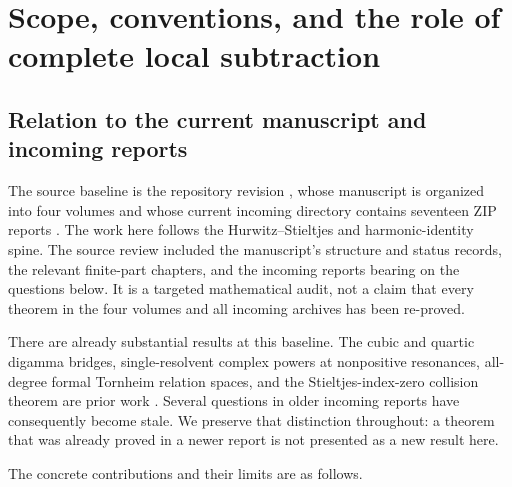\section{Scope, conventions, and the role of complete local subtraction}
\label{scope:section}

\subsection{Relation to the current manuscript and incoming reports}

The source baseline is the repository revision
, whose manuscript is
organized into four volumes and whose current incoming directory contains
seventeen ZIP reports \cite{repo:main}. The work here follows the
Hurwitz--Stieltjes and harmonic-identity spine. The source review included
the manuscript's structure and status records, the relevant finite-part
chapters, and the incoming reports bearing on the questions below.
It is a targeted mathematical audit, not a claim that every theorem in
the four volumes and all incoming archives has been re-proved.

There are already substantial results at this baseline. The cubic and
quartic digamma bridges, single-resolvent complex powers at nonpositive
resonances, all-degree formal Tornheim relation spaces, and the
Stieltjes-index-zero collision theorem are prior work
\cite{repo:cubic,repo:barnes,repo:quartic,repo:reflection}.
Several questions in older incoming reports have consequently become
stale. We preserve that distinction throughout: a theorem that was
already proved in a newer report is not presented as a new result here.

The concrete contributions and their limits are as follows.

